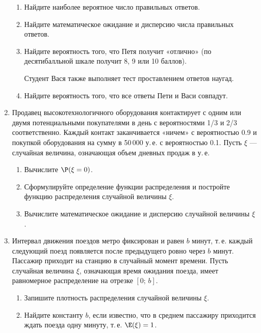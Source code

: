 \begin{enumerate}
\begin{enumerate}
\item	Найдите наиболее вероятное число правильных ответов.

\item	Найдите математическое ожидание и дисперсию числа правильных ответов.

\item	Найдите вероятность того, что Петя получит «отлично» (по десятибалльной шкале получит 8, 9 или 10 баллов).

Студент Вася также выполняет тест проставлением ответов наугад.

\item	Найдите вероятность того, что все ответы Пети и Васи совпадут.
\end{enumerate}

\newpage
\item  Продавец высокотехнологичного оборудования контактирует с одним или двумя потенциальными покупателями в день с вероятностями 1/3 и 2/3 соответственно. Каждый контакт заканчивается «ничем» с вероятностью 0.9 и покупкой оборудования на сумму в 50\,000 у.\,е. с вероятностью 0.1. Пусть $\xi$ — случайная величина, означающая объем дневных продаж в у.\,е.

\begin{enumerate}
\item	Вычислите  $\P(\xi = 0)$.

\item	Сформулируйте определение функции распределения и постройте функцию распределения случайной величины $\xi$.

\item	Вычислите математическое ожидание и дисперсию случайной величины $\xi$.
\end{enumerate}


\item  Интервал движения поездов метро фиксирован и равен $b$ минут, т.\,е. каждый следующий поезд появляется после предыдущего ровно через $b$ минут. Пассажир приходит на станцию в случайный момент времени. Пусть случайная величина $\xi$, означающая время ожидания поезда, имеет равномерное распределение на отрезке $[0; \, b]$.

\begin{enumerate}
\item Запишите плотность распределения случайной величины $\xi$.

\item	Найдите константу $b$, если известно, что в среднем пассажиру приходится ждать поезда одну минуту, т.\,е. $\E(\xi) = 1$.


\end{enumerate}
\end{enumerate}
